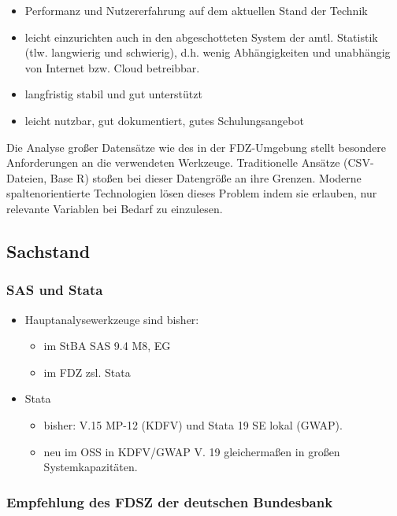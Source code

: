 \documentclass[
  german,
  10pt,
  twoside]{article}
\providecommand{\tightlist}{%
  \setlength{\itemsep}{0pt}\setlength{\parskip}{0pt}}
\begin{document}
\begin{itemize}
\tightlist
\item
  Performanz und Nutzererfahrung auf dem aktuellen Stand der Technik
\item
  leicht einzurichten auch in den abgeschotteten System der amtl.
  Statistik (tlw. langwierig und schwierig), d.h. wenig Abhängigkeiten
  und unabhängig von Internet bzw. Cloud betreibbar.
\item
  langfristig stabil und gut unterstützt
\item
  leicht nutzbar, gut dokumentiert, gutes Schulungsangebot
\end{itemize}

Die Analyse großer Datensätze wie des in der FDZ-Umgebung stellt
besondere Anforderungen an die verwendeten Werkzeuge. Traditionelle
Ansätze (CSV-Dateien, Base R) stoßen bei dieser Datengröße an ihre
Grenzen. Moderne spaltenorientierte Technologien lösen dieses Problem
indem sie erlauben, nur relevante Variablen bei Bedarf zu einzulesen.

\subsection{Sachstand}\label{sachstand}

\subsubsection{SAS und Stata}\label{sas-und-stata}

\begin{itemize}
\tightlist
\item
  Hauptanalysewerkzeuge sind bisher:

  \begin{itemize}
  \tightlist
  \item
    im StBA SAS 9.4 M8, EG
  \item
    im FDZ zsl. Stata
  \end{itemize}
\item
  Stata

  \begin{itemize}
  \tightlist
  \item
    bisher: V.15 MP-12 (KDFV) und Stata 19 SE lokal (GWAP).
  \item
    neu im OSS in KDFV/GWAP V. 19 gleichermaßen in großen
    Systemkapazitäten.
  \end{itemize}
\end{itemize}

\subsubsection{Empfehlung des FDSZ der deutschen
Bundesbank}\label{empfehlung-des-fdsz-der-deutschen-bundesbank}
\end{document}
